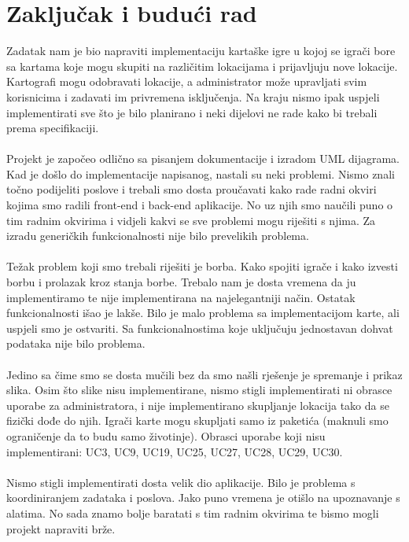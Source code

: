 \chapter{Zaključak i budući rad}

		Zadatak nam je bio napraviti implementaciju kartaške igre u kojoj se igrači bore sa kartama koje mogu skupiti na različitim lokacijama i prijavljuju nove lokacije. Kartografi mogu odobravati lokacije, a administrator može upravljati svim korisnicima i zadavati im privremena isključenja. Na kraju nismo ipak uspjeli implementirati sve što je bilo planirano i neki dijelovi ne rade kako bi trebali prema specifikaciji.
		\\ \\
		Projekt je započeo odlično sa pisanjem dokumentacije i izradom UML dijagrama. Kad je došlo do implementacije napisanog, nastali su neki problemi. Nismo znali točno podijeliti poslove i trebali smo dosta proučavati kako rade radni okviri kojima smo radili front-end i back-end aplikacije. No uz njih smo naučili puno o tim radnim okvirima i vidjeli kakvi se sve problemi mogu riješiti s njima. Za izradu generičkih funkcionalnosti nije bilo prevelikih problema.
		\\ \\
		Težak problem koji smo trebali riješiti je borba. Kako spojiti igrače i kako izvesti borbu i prolazak kroz stanja borbe. Trebalo nam je dosta vremena da ju implementiramo te nije implementirana na najelegantniji način. Ostatak funkcionalnosti išao je lakše. Bilo je malo problema sa implementacijom karte, ali uspjeli smo je ostvariti. Sa funkcionalnostima koje uključuju jednostavan dohvat podataka nije bilo problema.
		\\ \\
		Jedino sa čime smo se dosta mučili bez da smo našli rješenje je spremanje i prikaz slika. Osim što slike nisu implementirane, nismo stigli implementirati ni obrasce uporabe za administratora, i nije implementirano skupljanje lokacija tako da se fizički dođe do njih. Igrači karte mogu skupljati samo iz paketića (maknuli smo ograničenje da to budu samo životinje). Obrasci uporabe koji nisu implementirani: UC3, UC9, UC19, UC25, UC27, UC28, UC29, UC30.
		\\ \\
		Nismo stigli implementirati dosta velik dio aplikacije. Bilo je problema s koordiniranjem zadataka i poslova. Jako puno vremena je otišlo na upoznavanje s alatima. No sada znamo bolje baratati s tim radnim okvirima te bismo mogli projekt napraviti brže.

		 \eject
